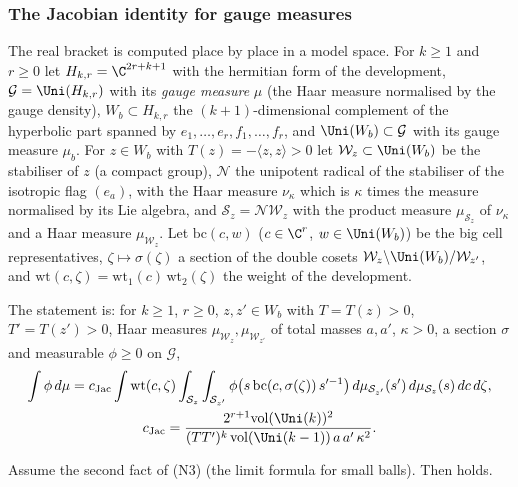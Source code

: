 \subsubsection*{The Jacobian identity for gauge measures}

The real bracket is computed place by place in a model space. For $k\ge1$ and $r\ge0$ let $H_{k,r}=\C^{2r+k+1}$ with the
hermitian form of the development, $\mathcal G=\Uni(H_{k,r})$ with its \emph{gauge measure} $\mu$ (the Haar measure
normalised by the gauge density), $W_b\subset H_{k,r}$ the $(k+1)$-dimensional complement of the hyperbolic part spanned by
$e_1,\dots,e_r,f_1,\dots,f_r$, and $\Uni(W_b)\subset\mathcal G$ with its gauge measure $\mu_b$. For $z\in W_b$ with
$T(z)=-\langle z,z\rangle>0$ let $\mathcal W_z\subset\Uni(W_b)$ be the stabiliser of $z$ (a compact group), $\mathcal N$ the
unipotent radical of the stabiliser of the isotropic flag $(e_a)$, with the Haar measure $\nu_\kappa$ which is $\kappa$
times the measure normalised by its Lie algebra, and $\mathcal S_z=\mathcal N\mathcal W_z$ with the product measure
$\mu_{\mathcal S_z}$ of $\nu_\kappa$ and a Haar measure $\mu_{\mathcal W_z}$. Let $\mathrm{bc}(c,w)$ ($c\in\C^r$,
$w\in\Uni(W_b)$) be the big cell representatives, $\zeta\mapsto\sigma(\zeta)$ a section of the double cosets
$\mathcal W_z\backslash\Uni(W_b)/\mathcal W_{z'}$, and $\mathrm{wt}(c,\zeta)=\mathrm{wt}_1(c)\,\mathrm{wt}_2(\zeta)$ the weight
of the development.

\begin{definition}\label{pf:multnc:def-jac}
The statement  is: for $k\ge1$, $r\ge0$, $z,z'\in W_b$ with $T=T(z)>0$, $T'=T(z')>0$, Haar measures
$\mu_{\mathcal W_z},\mu_{\mathcal W_{z'}}$ of total masses $a,a'$, $\kappa>0$, a section $\sigma$ and measurable
$\phi\ge0$ on $\mathcal G$,
\begin{gather*}
\int\phi\,d\mu=c_{\mathrm{Jac}}\int\mathrm{wt}(c,\zeta)\int_{\mathcal S_z}\int_{\mathcal S_{z'}}\phi\bigl(s\,
\mathrm{bc}(c,\sigma(\zeta))\,s'^{-1}\bigr)\,d\mu_{\mathcal S_{z'}}(s')\,d\mu_{\mathcal S_z}(s)\,dc\,d\zeta,\\
c_{\mathrm{Jac}}=\frac{2^{r+1}\mathrm{vol}(\Uni(k))^2}{(TT')^k\,\mathrm{vol}(\Uni(k-1))\,a\,a'\,\kappa^2}.
\end{gather*}
\end{definition}

\begin{proposition}\label{pf:multnc:jacgauge}
Assume the second fact of (N3) (the limit formula for small balls). Then  holds.
\end{proposition}

